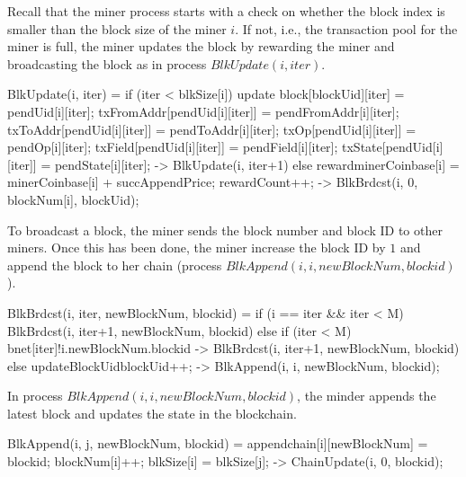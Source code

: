 \documentclass{KERauth}
\begin{document}
Recall that the miner process starts with a check on whether the block index is smaller than the block size of the miner $i$. If not, i.e., the transaction pool for the miner is full, the miner updates the block by rewarding the miner and broadcasting the block as in process $BlkUpdate(i, iter)$.
\begin{center}
\begin{boxedverbatim}
BlkUpdate(i, iter) =
  if (iter < blkSize[i]) {
    update{
      block[blockUid][iter] = pendUid[i][iter];
      txFromAddr[pendUid[i][iter]] = pendFromAddr[i][iter];
      txToAddr[pendUid[i][iter]] = pendToAddr[i][iter];
      txOp[pendUid[i][iter]] = pendOp[i][iter];
      txField[pendUid[i][iter]] = pendField[i][iter];
      txState[pendUid[i][iter]] = pendState[i][iter];} ->
    BlkUpdate(i, iter+1)}
  else {reward{minerCoinbase[i] = minerCoinbase[i] +
        succAppendPrice; rewardCount++;} ->
  BlkBrdcst(i, 0, blockNum[i], blockUid)};
\end{boxedverbatim}
\end{center}
To broadcast a block, the miner sends the block number and block ID to other miners. Once this has been done, the miner increase the block ID by $1$ and append the block to her chain (process $BlkAppend(i, i, newBlockNum, blockid)$).
\begin{center}
\begin{boxedverbatim}
BlkBrdcst(i, iter, newBlockNum, blockid) =
  if (i == iter && iter < M) {BlkBrdcst(i, iter+1, newBlockNum, blockid)}
  else if (iter < M) {
    bnet[iter]!i.newBlockNum.blockid ->
    BlkBrdcst(i, iter+1, newBlockNum, blockid)}
  else {
    updateBlockUid{blockUid++;} ->
    BlkAppend(i, i, newBlockNum, blockid)};
\end{boxedverbatim}
\end{center}

In process $BlkAppend(i, i, newBlockNum, blockid)$, the minder appends the latest block and updates the state in the blockchain.
\begin{center}
\begin{boxedverbatim}
BlkAppend(i, j, newBlockNum, blockid) =
  append{chain[i][newBlockNum] = blockid;
         blockNum[i]++;
         blkSize[i] = blkSize[j];} ->
  ChainUpdate(i, 0, blockid);
\end{boxedverbatim}
\end{center}
\end{document}
